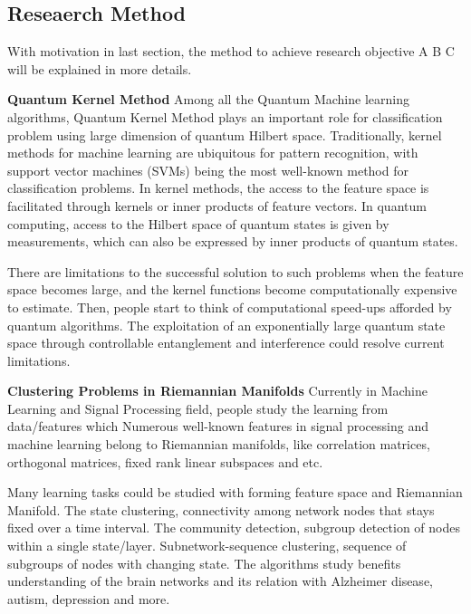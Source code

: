 \documentclass{article}
\begin{document}
\subsection{Reseaerch Method}
With motivation in last section, the method to achieve 
research objective A B C will be explained in more details. 

\textbf{Quantum Kernel Method} Among all the 
Quantum Machine learning algorithms, Quantum Kernel 
Method plays an important role for classification problem using 
large dimension of quantum Hilbert space. Traditionally, 
kernel methods for machine learning 
are ubiquitous for pattern recognition, 
with support vector machines (SVMs) being the most well-known method 
for classification problems. 
In kernel methods, the access to the feature space is facilitated 
through kernels or inner products of feature vectors. 
In quantum computing, access to the Hilbert space of quantum states
 is given by measurements, which can also be expressed 
 by inner products of quantum states. \cite{qml_kernel2}

There are limitations to the successful 
solution to such problems when the feature space becomes large, 
and the kernel functions become computationally expensive to estimate. 
Then, people start to think of computational speed-ups afforded by 
quantum algorithms. The exploitation of an exponentially 
large quantum state space through controllable 
entanglement and interference could resolve current limitations. 

\textbf{Clustering Problems in Riemannian Manifolds}
Currently in Machine Learning and Signal Processing field, 
people study the learning from data/features which 
Numerous well-known features in signal processing 
and machine learning belong to Riemannian manifolds, like 
correlation matrices, orthogonal matrices, fixed rank linear 
subspaces and etc. 

Many learning tasks could be studied with forming feature 
space and Riemannian Manifold. The state clustering, 
connectivity among network nodes that stays fixed over a 
time interval. The community detection, subgroup detection 
of nodes within a single state/layer. Subnetwork-sequence 
clustering, sequence of subgroups of nodes with changing state. 
The algorithms study benefits understanding of the brain networks 
and its relation with Alzheimer disease, autism, depression and more.
\end{document}
